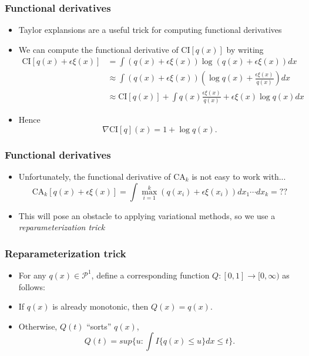\documentclass{beamer}
\begin{document}
\begin{frame}
\frametitle{Functional derivatives}
\begin{itemize}
\item Taylor explansions are a useful trick for computing functional derivatives
\item We can compute the functional derivative of $\text{CI}[q(x)]$ by writing
\begin{align*}
\text{CI}[q(x) + \epsilon \xi(x)] &= \int (q(x) + \epsilon \xi(x)) \log (q(x) + \epsilon \xi(x)) dx
\\&\approx  \int (q(x) + \epsilon \xi(x)) (\log q(x) + \frac{\epsilon \xi(x)}{q(x)}) dx
\\&\approx  \text{CI}[q(x)] + \int q(x) \frac{\epsilon \xi(x)}{q(x)} + \epsilon \xi(x) \log q(x) dx
\end{align*}
\item Hence
\[
\nabla \text{CI}[q](x) = 1 + \log q(x).
\]
\end{itemize}
\end{frame}

\begin{frame}
\frametitle{Functional derivatives}
\begin{itemize}
\item Unfortunately, the functional derivative of $\text{CA}_k$ is not easy to work with...
\[
\text{CA}_k[q(x) + \epsilon \xi(x)] = \int \max_{i=1}^k (q(x_i) + \epsilon \xi(x_i))  dx_1\cdots dx_k = ??
\]
\item This will pose an obstacle to applying variational methods, so we use a \emph{reparameterization trick}
\end{itemize}
\end{frame}

\begin{frame}
\frametitle{Reparameterization trick}
\begin{itemize}
\item For any $q(x) \in \mathcal{P}^1$, define a corresponding function $Q: [0, 1] \to [0,\infty)$ as follows:
\item If $q(x)$ is already monotonic, then $Q(x) = q(x)$.
\item Otherwise, $Q(t)$ ``sorts'' $q(x)$,
\[
Q(t) = sup \{u: \int I\{q(x) \leq u\}dx \leq t\}.
\]
\end{itemize}
\end{frame}
\end{document}
